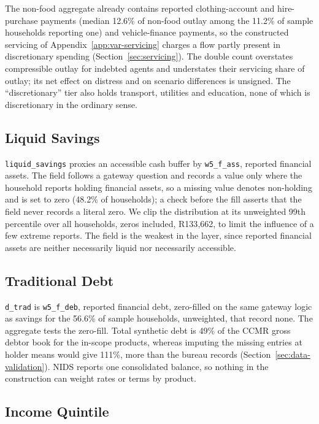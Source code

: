 The non-food aggregate already contains reported clothing-account and hire-purchase payments
(median 12.6\% of non-food outlay among the 11.2\% of sample households reporting one) and
vehicle-finance payments, so the constructed servicing of Appendix~\ref{app:var-servicing} charges a flow partly present
in discretionary spending (Section~\ref{sec:servicing}). The double count overstates compressible
outlay for indebted agents and understates their servicing share of outlay; its net effect on
distress and on scenario differences is unsigned. The ``discretionary'' tier also holds
transport, utilities and education, none of which is discretionary in the ordinary sense.

\subsection{Liquid Savings}\label{app:var-savings}

\texttt{liquid\_savings} proxies an accessible cash buffer by \texttt{w5\_f\_ass}, reported
financial assets. The field follows a gateway question and records a value only where the
household reports holding financial assets, so a missing value denotes non-holding and is set to
zero (48.2\% of households); a check before the fill asserts that the field never records a
literal zero. We clip the distribution at its unweighted 99th percentile over all households,
zeros included, R133{,}662, to limit the influence of a few extreme reports. The field is the
weakest in the layer, since reported financial assets are neither necessarily liquid nor
necessarily accessible.

\subsection{Traditional Debt}\label{app:var-debt}

\texttt{d\_trad} is \texttt{w5\_f\_deb}, reported financial debt, zero-filled on the same gateway
logic as savings for the 56.6\% of sample households, unweighted, that record none. The aggregate
tests the zero-fill. Total synthetic debt is 49\% of the \ac{CCMR} gross debtor book for the
in-scope products, whereas imputing the missing entries at holder means would give 111\%, more
than the bureau records (Section~\ref{sec:data-validation}).
\ac{NIDS} reports one consolidated balance, so nothing in the construction can weight rates or
terms by product.

\subsection{Income Quintile}\label{app:var-quintile}

